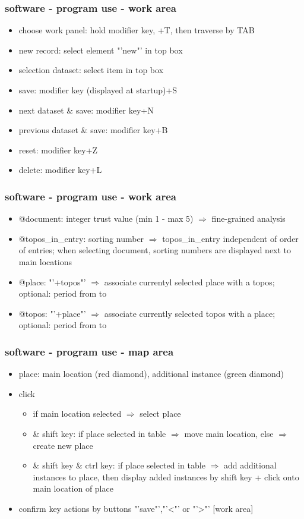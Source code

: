 \documentclass{beamer}
\begin{document}
	
\begin{frame}
			\frametitle{software -  program use - work area} 
				\begin{itemize}
					\item choose work panel: hold modifier key, +T, then traverse by TAB 
					\item new record: select element "'new"' in top box
					\item selection dataset: select item in top box
					\item save: modifier key (displayed at startup)+S
					\item next dataset \& save: modifier key+N
					\item previous dataset \& save: modifier key+B
					\item reset: modifier key+Z
					\item delete: modifier key+L
				\end{itemize}
	\end{frame}	

	\begin{frame}
			\frametitle{software - program use - work area} 
				\begin{itemize}
					\item @document: integer trust value (min 1 - max 5) $\Rightarrow$ fine-grained analysis
					\item @topos\_in\_entry: sorting number $\Rightarrow$ topos\_in\_entry independent of order of entries; when selecting document, sorting numbers are displayed next to main locations
					\item @place: "'+topos"' $\Rightarrow$ associate currentyl selected place with a topos; optional: period from to
					\item @topos: "'+place"' $\Rightarrow$ associate currently selected topos with a place; optional: period from to
				\end{itemize}
	\end{frame}	


	\begin{frame}
			\frametitle{software  - program use - map area} 
				\begin{itemize}
				\item place: main location (red diamond), additional instance (green diamond)
				\item click
				\begin{itemize}
						\item if main location selected $\Rightarrow$ select place
						\item \& shift key: if place selected in table $\Rightarrow$ move main location, else $\Rightarrow$ create new place
						\item \& shift key \& ctrl key: if place selected in table $\Rightarrow$ add additional instances to place, then display added instances by shift key + click onto main location of place
\end{itemize}								
				\item confirm key actions by buttons "'save"',"'\textless"' or "'\textgreater"' [work area]
				\end{itemize}
	\end{frame}
	
\end{document}

